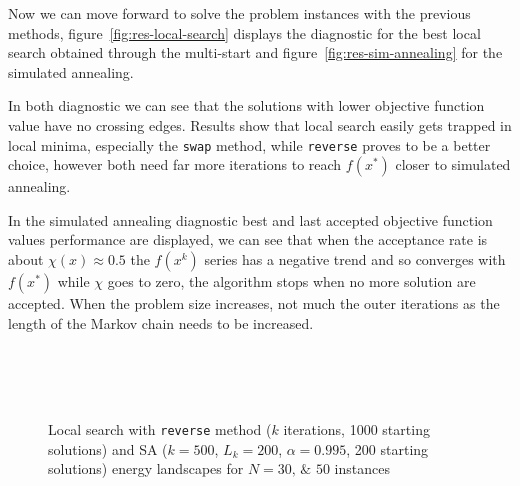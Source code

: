 Now we can move forward to solve the problem instances with the previous methods, figure~\ref{fig:res-local-search} displays the diagnostic for the best local search obtained through the multi-start and figure~\vref{fig:res-sim-annealing} for the simulated annealing.

In both diagnostic we can see that the solutions with lower objective function value have no crossing edges. Results show that local search easily gets trapped in local minima, especially the \texttt{swap} method, while \texttt{reverse} proves to be a better choice, however both need far more iterations to reach $f(x^\ast)$ closer to simulated annealing.

In the simulated annealing diagnostic best and last accepted objective function values performance are displayed, we can see that when the acceptance rate is about $\chi(x)\approx0.5$ the $f(x^k)$ series has a negative trend and so converges with $f(x^\ast)$ while $\chi$ goes to zero, the algorithm stops when no more solution are accepted. When the problem size increases, not much the outer iterations as the length of the Markov chain needs to be increased.


\begin{figure}
\centering
{} \,
 \\
 \,
 \\
 \,
\caption{Local search with \texttt{reverse} method ($k$ iterations, 1000 starting solutions) and SA ($k=500$, $L_k=200$, $\alpha=0.995$, 200 starting solutions) energy landscapes for $N=\numlist{30;50}$ instances}
\label{fig:res-energy}
\end{figure}



